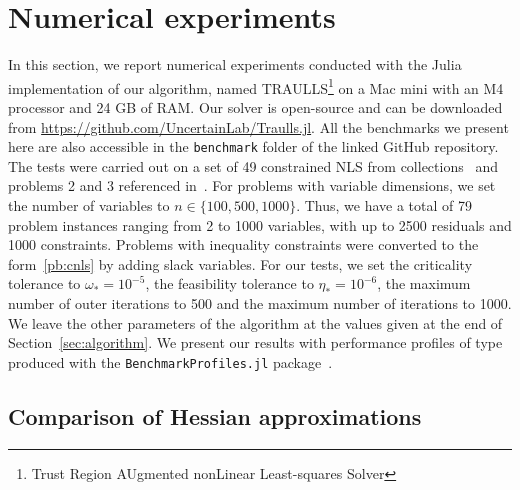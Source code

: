 \section{Numerical experiments}\label{sec:numerical_experiments}

In this section, we report numerical experiments conducted with the Julia implementation of our algorithm, named TRAULLS\footnote{Trust Region AUgmented nonLinear Least-squares Solver} on a Mac mini with an M4 processor and 24 GB of RAM. Our solver is open-source and can be downloaded from \url{https://github.com/UncertainLab/Traulls.jl}. All the benchmarks we present here are also accessible in the \texttt{benchmark} folder of the linked GitHub repository.
The tests were carried out on a set of 49 constrained NLS from collections~\cite{hockschittkowski:1980, schittkowski:1987, lucksanvlcek:1999} and problems 2 and 3 referenced in~\cite{biegler-etal2000}. For problems with variable dimensions, we set the number of variables to $n \in \{100, 500, 1000\}$. Thus, we have a total of 79 problem instances ranging from 2 to 1000 variables, with up to 2500 residuals and 1000 constraints. Problems with inequality constraints were converted to the form~\eqref{pb:cnls} by adding slack variables. For our tests, we set the criticality tolerance to $\omega_* = 10^{-5}$, the feasibility tolerance to $\eta_* = 10^{-6}$, the maximum number of outer iterations to 500 and the maximum number of iterations to 1000. We leave the other parameters of the algorithm at the values given at the end of Section~\ref{sec:algorithm}. We present our results with performance profiles of type~\citet{dolanmore:2002} produced with the \texttt{BenchmarkProfiles.jl} package~\cite{benchmark-profiles-julia}.

\subsection{Comparison of Hessian approximations}

